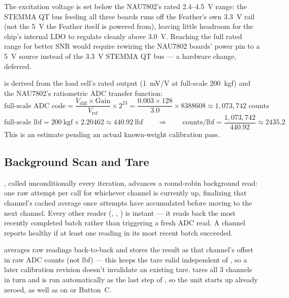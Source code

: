 ﻿\documentclass[11pt,letterpaper]{article}
\begin{document}
The excitation voltage is set below the NAU7802's rated 2.4--4.5~V range:
the STEMMA QT bus feeding all three boards runs off the Feather's own
3.3~V rail (not the 5~V the Feather itself is powered from), leaving
little headroom for the chip's internal LDO to regulate cleanly above
3.0~V. Reaching the full rated range for better SNR would require
rewiring the NAU7802 boards' power pin to a 5~V source instead of the
3.3~V STEMMA QT bus --- a hardware change, deferred.

 is derived from the load cell's rated
output (1~mV/V at full-scale 200~kgf) and the NAU7802's ratiometric ADC
transfer function:
\[
\text{full-scale ADC code} = \frac{V_{\text{diff}} \times \text{Gain}}{V_{\text{ref}}} \times 2^{23}
= \frac{0.003 \times 128}{3.0} \times 8388608 \approx 1{,}073{,}742 \text{ counts}
\]
\[
\text{full-scale lbf} = 200~\text{kgf} \times 2.20462 \approx 440.92~\text{lbf}
\qquad\Rightarrow\qquad
\text{counts/lbf} = \frac{1{,}073{,}742}{440.92} \approx 2435.2
\]
This is an estimate pending an actual known-weight calibration pass.

\subsection{Background Scan and Tare}

, called unconditionally every 
iteration, advances a round-robin background read: one raw attempt per
call for whichever channel is currently up, finalizing that channel's
cached average once  attempts have accumulated
before moving to the next channel. Every other reader
(, , ) is instant ---
it reads back the most recently completed batch rather than triggering a
fresh ADC read. A channel reports healthy if at least one reading in its
most recent batch succeeded.

 averages  raw readings
back-to-back and stores the result as that channel's offset in raw ADC
counts (not lbf) --- this keeps the tare valid independent of
, so a later calibration revision doesn't
invalidate an existing tare.  tares all 3 channels in turn and
is run automatically as the last step of , so the unit starts
up already zeroed, as well as on  or Button~C.

\end{document}
